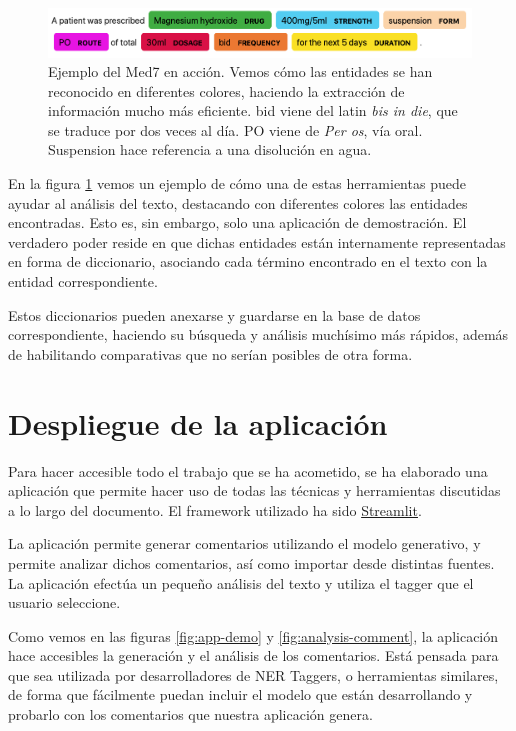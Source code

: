 \begin{figure}[h]
	\centering
	\includegraphics[width=.9\textwidth]{media/med7_example.png}
	\caption{Ejemplo del Med7 en acción. Vemos cómo las entidades se han reconocido en diferentes colores, haciendo la extracción de información mucho más eficiente. bid viene del latin \textit{bis in die}, que se traduce por dos veces al día. PO viene de \textit{Per os}, vía oral. Suspension hace referencia a una disolución en agua.}
	\label{fig:med7}
\end{figure}

En la figura \ref{fig:med7} vemos un ejemplo de cómo una de estas herramientas puede ayudar al análisis del texto, destacando con diferentes colores las entidades encontradas. Esto es, sin embargo, solo una aplicación de demostración. El verdadero poder reside en que dichas entidades están internamente representadas en forma de diccionario, asociando cada término encontrado en el texto con la entidad correspondiente. 

Estos diccionarios pueden anexarse y guardarse en la base de datos correspondiente, haciendo su búsqueda y análisis muchísimo más rápidos, además de habilitando comparativas que no serían posibles de otra forma.


\section{Despliegue de la aplicación}

Para hacer accesible todo el trabajo que se ha acometido, se ha elaborado una aplicación que permite hacer uso de todas las técnicas y herramientas discutidas a lo largo del documento. El framework utilizado ha sido \href{https://streamlit.io}{Streamlit}.

La aplicación permite generar comentarios utilizando el modelo generativo, y permite analizar dichos comentarios, así como importar desde distintas fuentes. La aplicación efectúa un pequeño análisis del texto y utiliza el tagger que el usuario seleccione.

Como vemos en las figuras \ref{fig:app-demo} y \ref{fig:analysis-comment}, la aplicación hace accesibles la generación y el análisis de los comentarios. Está pensada para que sea utilizada por desarrolladores de NER Taggers, o herramientas similares, de forma que fácilmente puedan incluir el modelo que están desarrollando y probarlo con los comentarios que nuestra aplicación genera.

